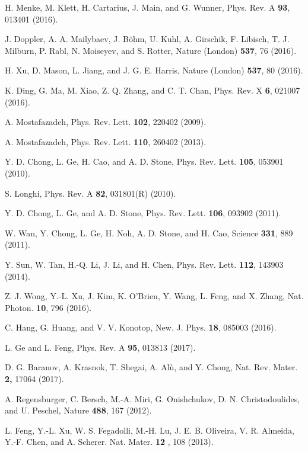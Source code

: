 \documentclass[prl,showpacs,superscriptaddress,twocolumn]{revtex4-1}
\begin{document}
\begin{thebibliography}{999}
 H. Menke, M. Klett, H. Cartarius, J. Main, and G. Wunner,
Phys. Rev. A \textbf{93}, 013401 (2016).

 J. Doppler, A. A. Mailybaev, J. B\"{o}hm, U. Kuhl, A.
Girschik, F. Libisch, T. J. Milburn, P. Rabl, N. Moiseyev, and S. Rotter,
Nature (London) \textbf{537}, 76 (2016).

 H. Xu, D. Mason, L. Jiang, and J. G. E. Harris, Nature (London)
\textbf{537}, 80 (2016).

 K. Ding, G. Ma, M. Xiao, Z. Q. Zhang, and C. T. Chan,
Phys. Rev. X \textbf{6}, 021007 (2016).

 A. Mostafazadeh, Phys. Rev. Lett. \textbf{102}, 220402 (2009).

 A. Mostafazadeh, Phys. Rev. Lett. \textbf{110}, 260402
(2013).

 Y. D. Chong, L. Ge, H. Cao, and A. D. Stone, Phys. Rev. Lett.
\textbf{105}, 053901 (2010).

 S. Longhi, Phys. Rev. A \textbf{82}, 031801(R) (2010).

 Y. D. Chong, L. Ge, and A. D. Stone, Phys. Rev. Lett.
\textbf{106}, 093902 (2011).

 W. Wan, Y. Chong, L. Ge, H. Noh, A. D. Stone, and H. Cao,
Science \textbf{331}, 889 (2011).

 Y. Sun, W. Tan, H.-Q. Li, J. Li, and H. Chen, Phys. Rev. Lett.
\textbf{112}, 143903 (2014).

 Z. J. Wong, Y.-L. Xu, J. Kim, K. O'Brien, Y. Wang, L. Feng,
and X. Zhang, Nat. Photon. \textbf{10}, 796 (2016).

 C. Hang, G. Huang, and V. V. Konotop, New. J. Phys.
\textbf{18}, 085003 (2016).

 L. Ge and L. Feng, Phys. Rev. A \textbf{95}, 013813
(2017).

 D. G. Baranov, A. Krasnok, T. Shegai, A. Al\`{u}, and Y.
Chong, Nat. Rev. Mater. \textbf{2,} 17064 (2017).

 A. Regensburger, C. Bersch, M.-A. Miri, G. Onishchukov, D.
N. Christodoulides, and U. Peschel, Nature \textbf{488}, 167 (2012).

 L. Feng, Y.-L. Xu, W. S. Fegadolli, M.-H. Lu, J. E. B.
Oliveira, V. R. Almeida, Y.-F. Chen, and A. Scherer. Nat. Mater. \textbf{12}%
, 108 (2013).


\end{thebibliography}
\end{document}
